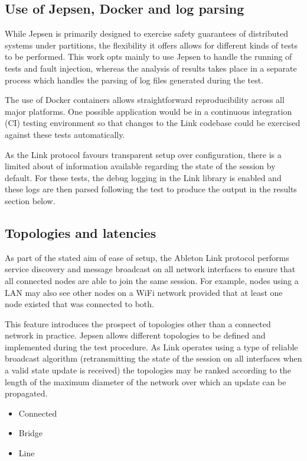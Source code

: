 \documentclass[11pt]{article} %
\theoremstyle{plain}
\theoremstyle{definition}
\begin{document}
\subsection{Use of Jepsen, Docker and log parsing}

While Jepsen is primarily designed to exercise safety guarantees of distributed
systems under partitions, the flexibility it offers allows for different kinds
of tests to be performed. This work opts mainly to use Jepsen to handle the
running of tests and fault injection, whereas the analysis of results takes
place in a separate process which handles the parsing of log files generated
during the test.

The use of Docker containers allows straightforward reproducibility across all
major platforms. One possible application would be in a continuous integration
(CI) testing environment so that changes to the Link codebase could be
exercised against these tests automatically.

As the Link protocol favours transparent setup over configuration, there is a
limited about of information available regarding the state of the session by
default. For these tests, the debug logging in the Link library is enabled and
these logs are then parsed following the test to produce the output in the
results section below.

\subsection{Topologies and latencies}

As part of the stated aim of ease of setup, the Ableton Link protocol performs
service discovery and message broadcast on all network interfaces to ensure
that all connected nodes are able to join the same session. For example, nodes
using a LAN may also see other nodes on a WiFi network provided that at least
one node existed that was connected to both.

This feature introduces the prospect of topologies other than a connected
network in practice. Jepsen allows different topologies to be defined and
implemented during the test procedure. As Link operates using a type of
reliable broadcast algorithm (retransmitting the state of the session on all
interfaces when a valid state update is received) the topologies may be ranked
according to the length of the maximum diameter of the network over which an
update can be propagated.

\begin{itemize}
  \item Connected
  \item Bridge
  \item Line
\end{itemize}
\end{document}
